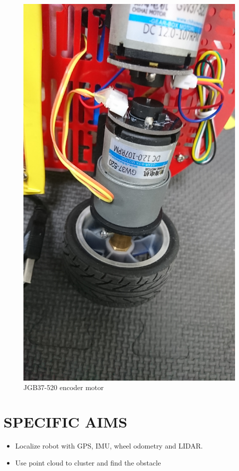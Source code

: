\documentclass[letterpaper, 10 pt, conference]{ieeeconf}  %
\begin{document}
\begin{figure}[t] %
\includegraphics[width=0.8\columnwidth]{JGB37-520}
\centering
\caption{JGB37-520 encoder motor}
 \label{figure:JGB37-520}
\end{figure}

\section{SPECIFIC AIMS}

\begin{itemize}
\item Localize robot with GPS, IMU, wheel odometry and LIDAR.
\end{itemize}

\begin{itemize}
\item Use point cloud to cluster and find the obstacle
\end{itemize}
\end{document}
